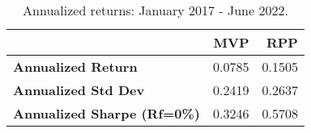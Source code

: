\begin{table}[!htb]
	\centering
	\begingroup
	\fontsize{9}{9}
	\selectfont
	\begin{tabular}{>{}lrr}
		\toprule
		                                    & MVP    & RPP    \\
		\midrule
		\textbf{Annualized Return}          & 0.0785 & 0.1505 \\
		\textbf{Annualized Std Dev}         & 0.2419 & 0.2637 \\
		\textbf{Annualized Sharpe (Rf=0\%)} & 0.3246 & 0.5708 \\
		\bottomrule
	\end{tabular} \caption{Annualized returns: January 2017 - June 2022.}
	\label{tab:RPP}  %
	\endgroup{}
\end{table}